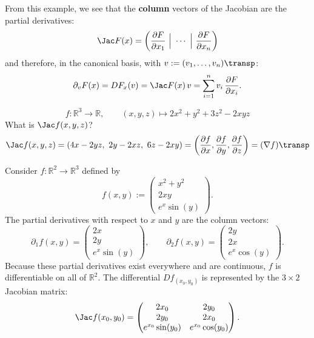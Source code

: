 
From this example, we see that the \textbf{column} vectors of the Jacobian are the partial
derivatives:
\[\Jac F(x) = \left(\frac{\partial F}{\partial x_1}\ \Big|\ \cdots\ \Big|\ \frac{\partial F}{\partial x_n}\right)\]
and therefore, in the canonical basis, with $v := (v_1,\dots,v_n)\transp$:
\[\partial_v F(x) = DF_x(v) = \Jac F(x)\,v = \sum_{i=1}^{n} v_i\,\frac{\partial F}{\partial x_i}.\]

\begin{example}
\[f : \mathbb{R}^3\to\mathbb{R}, \qquad (x,y,z) \mapsto 2x^2 + y^2 + 3z^2 - 2xyz\]
What is $\Jac f(x,y,z)$?
\[\Jac f(x,y,z) = (4x - 2yz,\ 2y - 2xz,\ 6z - 2xy) = \left(\frac{\partial f}{\partial x}, \frac{\partial f}{\partial y}, \frac{\partial f}{\partial z}\right) = (\nabla f)\transp\]
\end{example}

\begin{example}
\label{ex:jacobian_vector_field}
Consider $f : \mathbb{R}^2 \to \mathbb{R}^3$ defined by
\[f(x,y) := \begin{pmatrix} x^2+y^2 \\ 2xy \\ e^x\sin(y) \end{pmatrix}.\]
The partial derivatives with respect to $x$ and $y$ are the column vectors:
\[\partial_1 f(x,y) = \begin{pmatrix} 2x \\ 2y \\ e^x\sin(y) \end{pmatrix}, \qquad \partial_2 f(x,y) = \begin{pmatrix} 2y \\ 2x \\ e^x\cos(y) \end{pmatrix}.\]
Because these partial derivatives exist everywhere and are continuous, $f$ is differentiable on all of $\mathbb{R}^2$. The differential $Df_{(x_0,y_0)}$ is represented by the $3 \times 2$ Jacobian matrix:
\[\Jac f(x_0,y_0) = \begin{pmatrix} 2x_0 & 2y_0 \\ 2y_0 & 2x_0 \\ e^{x_0}\sin(y_0) & e^{x_0}\cos(y_0) \end{pmatrix}.\]
\end{example}

